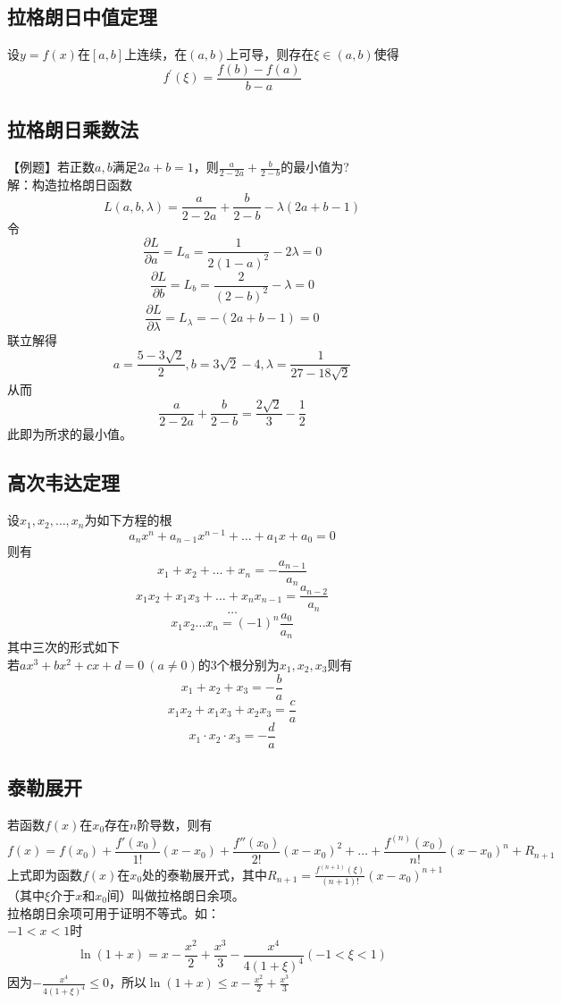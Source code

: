 \documentclass[UTF8]{ctexart}
\begin{document}
		\subsection{拉格朗日中值定理}
			设$y=f(x)$在$[a,b]$上连续，在$(a,b)$上可导，则存在$\xi \in (a,b)$使得
			\[f^{'}(\xi)=\frac{f(b)-f(a)}{b-a}\]
		\subsection{拉格朗日乘数法}
			【例题】若正数$a,b$满足$2a+b=1$，则$\frac{a}{2-2a}+\frac{b}{2-b}$的最小值为?\\
			解：构造拉格朗日函数
			\[L(a,b,\lambda)=\frac{a}{2-2a}+\frac{b}{2-b}-\lambda(2a+b-1)\]
			令
			\[\frac{\partial L}{\partial a}=L_a=\frac{1}{2(1-a)^2}-2\lambda=0\]
			\[\frac{\partial L}{\partial b}=L_b=\frac{2}{(2-b)^2}-\lambda=0\]
			\[\frac{\partial L}{\partial \lambda}=L_\lambda=-(2a+b-1)=0\]
			联立解得
			\[a=\frac{5-3\sqrt{2}}{2},b=3\sqrt{2}-4,\lambda=\frac{1}{27-18\sqrt{2}}\]
			从而
			\[\frac{a}{2-2a}+\frac{b}{2-b}=\frac{2\sqrt{2}}{3}-\frac{1}{2}\]
			此即为所求的最小值。
		\subsection{高次韦达定理}
			设$x_1,x_2,\dots,x_n$为如下方程的根
			\[a_n x^n+a_{n-1} x^{n-1}+\dots+a_1 x+a_0=0\]
			则有
			\[x_1+x_2+\dots+x_n=-\frac{a_{n-1}}{a_n}\]
			\[x_1 x_2+x_1 x_3+\dots+x_n x_{n-1}=\frac{a_{n-2}}{a_n}\]
			\[\dots\]
			\[x_1 x_2\dots x_n=(-1)^n \frac{a_0}{a_n}\]
			其中三次的形式如下\\
			若$ax^3+bx^2+cx+d=0\ (a\neq 0)$的3个根分别为$x_1,x_2,x_3$则有
			\[x_1+x_2+x_3=-\frac{b}{a}\]
			\[x_1 x_2+x_1 x_3+x_2 x_3=\frac{c}{a}\]
			\[x_1\cdot x_2\cdot x_3=-\frac{d}{a}\]		
		\subsection{泰勒展开}
			若函数$f(x)$在$x_0$存在$n$阶导数，则有
			\[f(x)=f(x_0)+\frac{f'(x_0)}{1!}(x-x_0)+\frac{f''(x_0)}{2!}(x-x_0)^2+\dots+\frac{f^{(n)} (x_0)}{n!}(x-x_0)^n+R_{n+1}\]
			上式即为函数$f(x)$在$x_0$处的泰勒展开式，其中$R_{n+1}=\frac{f^{(n+1)} (\xi)}{(n+1)!}(x-x_0)^{n+1}$（其中$\xi$介于$x$和$x_0$间）叫做拉格朗日余项。\\
			拉格朗日余项可用于证明不等式。如：\\
			$-1<x<1$时
			\[\ln(1+x)=x-\frac{x^2}{2}+\frac{x^3}{3}-\frac{x^4}{4(1+\xi)^4} (-1<\xi<1)\]
			因为$-\frac{x^4}{4(1+\xi)^4}\leq 0$，所以$\ln(1+x)\leq x-\frac{x^2}{2}+\frac{x^3}{3}$
\end{document}
